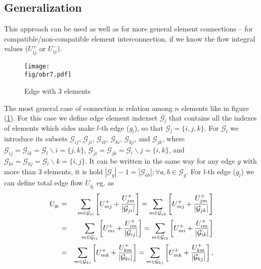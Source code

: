  \subsection{Generalization}
  This approach can be used as well as for more general element connections -- for compatible/non-compatible element interconnection, if we know the flow integral
  values ($U_{ij}^{+}$ or $U_{ij}^{-}$). %
      \begin{figure}[h]
        \begin{center}
        \texttt{[image: \\fig/obr7.pdf]} 
	\caption{Edge with 3 elements}
	\label{edgemodel}
        \end{center}
      \end{figure}  
  The most general case of connection is relation among $n$ elements like in figure (\ref{edgemodel}). For this case we define
edge element indexset $\mathcal{G}_{l}$ that contains all the indexes of elements which sides make $l$-th edge ($g_l$), so that $\mathcal{G}_{l} = \{i,j,k\}$.
For $\mathcal{G}_{l}$ we introduce its subsets $\mathcal{G}_{ij}$, $\mathcal{G}_{ji}$, $\mathcal{G}_{ik}$, $\mathcal{G}_{ki}$, $\mathcal{G}_{kj}$, and $\mathcal{G}_{jk}$,
  where $\mathcal{G}_{ij} = \mathcal{G}_{ik} =  \mathcal{G}_{l} \backslash {i} = \{j,k\}$, $ \mathcal{G}_{ji} = \mathcal{G}_{jk} = \mathcal{G}_{l} \backslash {j} =\{i,k\}$, and
 $\mathcal{G}_{ki} = \mathcal{G}_{kj} = \mathcal{G}_{l} \backslash {k} =\{i,j\}$. It can be written in the same way for any edge $g$ with more than 3 elements, 
it is hold  $|\mathcal{G}_{g}| - 1 = |\mathcal{G}_{ab}|; \forall a,b \in \mathcal{G}_{g}$.
For $l$-th edge ($g_l$) we can define total edge flow $U_{g_{l}}$ eg. as
  \begin{eqnarray}
   U_{g_{l}} &=& \sum\limits_{m \in \mathcal{G}_{ji}}   \left[ U_{mj}^{+}   + \frac{ U_{jm}^{+}}{|\mathcal{G}_{ji}|} \right] = \sum\limits_{m \in \mathcal{G}_{jk}}  \left[ U_{mj}^{+}   +  \frac{ U_{jm}^{+}}{|\mathcal{G}_{jk}|} \right] \notag \\
	      &=& \sum\limits_{m \in \mathcal{G}_{ij}}  \left[ U_{mi}^{+}   +  \frac{ U_{im}^{+}}{|\mathcal{G}_{ij}|} \right] = \sum\limits_{m \in \mathcal{G}_{ik}} \left[  U_{mi}^{+} +  \frac{ U_{im}^{+}}{|\mathcal{G}_{ik}|} \right] \notag \\ 
	      &=& \sum\limits_{m \in \mathcal{G}_{ki}}  \left[ U_{mk}^{+}   +  \frac{ U_{km}^{+}}{|\mathcal{G}_{ki}|} \right] = \sum\limits_{m \in \mathcal{G}_{kj}}  \left[ U_{mk}^{+}   +  \frac{ U_{km}^{+}}{|\mathcal{G}_{kj}|} \right], \label{edgeflow}
  \end{eqnarray}
